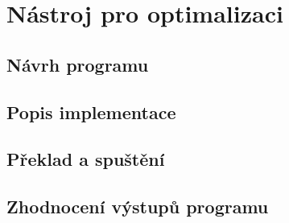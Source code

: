 \chapter{Nástroj pro optimalizaci}\label{Implementation}



\section{Návrh programu}
\section{Popis implementace}
\section{Překlad a spuštění}
\section{Zhodnocení výstupů programu}
